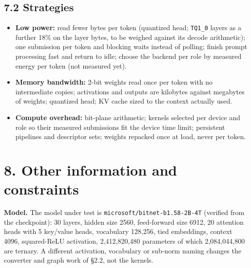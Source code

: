 \documentclass[
  10pt,
]{article}
\providecommand{\tightlist}{%
  \setlength{\itemsep}{0pt}\setlength{\parskip}{0pt}}
\begin{document}
\subsection{7.2 Strategies}\label{strategies}

\begin{itemize}
\tightlist%
\item
  \textbf{Low power:} read fewer bytes per token (quantized head;
  \texttt{TQ1\_0} layers as a further 18\% on the layer bytes, to be
  weighed against its decode arithmetic); one submission per token and
  blocking waits instead of polling; finish prompt processing fast and
  return to idle; choose the backend per role by measured energy per
  token (not measured yet).
\item
  \textbf{Memory bandwidth:} 2-bit weights read once per token with no
  intermediate copies; activations and outputs are kilobytes against
  megabytes of weights; quantized head; KV cache sized to the context
  actually used.
\item
  \textbf{Compute overhead:} bit-plane arithmetic; kernels selected per
  device and role so their measured submissions fit the device time limit;
  persistent pipelines and descriptor sets; weights repacked once at
  load, never per token.
\end{itemize}

\section{8. Other information and
constraints}\label{other-information-and-constraints}

\textbf{Model.} The model under test is
\texttt{microsoft/bitnet-b1.58-2B-4T} (verified from the checkpoint): 30
layers, hidden size 2560, feed-forward size 6912, 20 attention heads
with 5 key/value heads, vocabulary 128,256, tied embeddings, context
4096, squared-ReLU activation, 2,412,820,480 parameters of which
2,084,044,800 are ternary. A different activation, vocabulary or
sub-norm naming changes the converter and graph work of \S{}2.2, not the
kernels.
\end{document}
